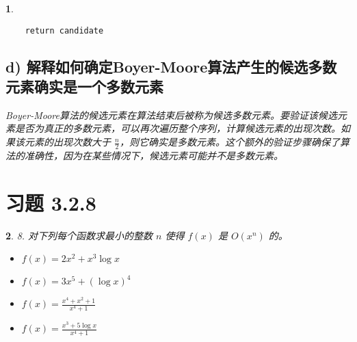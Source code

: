 \documentclass[UTF8]{report}
\theoremstyle{MyLineTheoremStyle} %
\theoremstyle{MyBlockTheoremStyle} %
\theoremstyle{MySubsubsectionStyle} %
\newtheorem{definition}{}
\begin{document}
\begin{definition}
\begin{verbatim}
    return candidate
\end{verbatim}

\subsection{d) 解释如何确定Boyer-Moore算法产生的候选多数元素确实是一个多数元素}

Boyer-Moore算法的候选元素在算法结束后被称为候选多数元素。要验证该候选元素是否为真正的多数元素，可以再次遍历整个序列，计算候选元素的出现次数。如果该元素的出现次数大于 $\frac{n}{2}$，则它确实是多数元素。这个额外的验证步骤确保了算法的准确性，因为在某些情况下，候选元素可能并不是多数元素。
\end{definition}

\section{习题 3.2.8}

\begin{definition}
    8. 对下列每个函数求最小的整数 \( n \) 使得 \( f(x) \) 是 \( O(x^n) \) 的。
    \begin{itemize}
        \item[a)] \( f(x) = 2x^2 + x^3 \log x \)
        \item[b)] \( f(x) = 3x^5 + (\log x)^4 \)
        \item[c)] \( f(x) = \frac{x^4 + x^2 + 1}{x^4 + 1} \)
        \item[d)] \( f(x) = \frac{x^3 + 5 \log x}{x^4 + 1} \)
    \end{itemize}
\end{definition}
\end{document}
